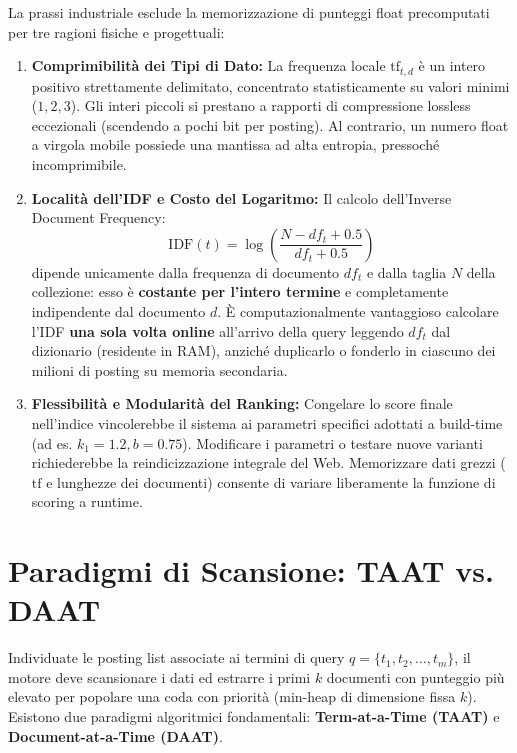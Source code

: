La prassi industriale esclude la memorizzazione di punteggi float precomputati per tre ragioni fisiche e progettuali:
\begin{enumerate}
    \item \textbf{Comprimibilit\`a dei Tipi di Dato:} La frequenza locale $\text{tf}_{t,d}$ \`e un intero positivo strettamente delimitato, concentrato statisticamente su valori minimi ($1, 2, 3$). Gli interi piccoli si prestano a rapporti di compressione lossless eccezionali (scendendo a pochi bit per posting). Al contrario, un numero float a virgola mobile possiede una mantissa ad alta entropia, pressoch\'e incomprimibile.
    \item \textbf{Localit\`a dell'IDF e Costo del Logaritmo:} Il calcolo dell'Inverse Document Frequency:
    \begin{equation}
    \text{IDF}(t) = \log \left( \frac{N - df_t + 0.5}{df_t + 0.5} \right)
    \end{equation}
    dipende unicamente dalla frequenza di documento $df_t$ e dalla taglia $N$ della collezione: esso \`e \textbf{costante per l'intero termine} e completamente indipendente dal documento $d$. \`E computazionalmente vantaggioso calcolare l'IDF \textbf{una sola volta online} all'arrivo della query leggendo $df_t$ dal dizionario (residente in RAM), anzich\'e duplicarlo o fonderlo in ciascuno dei milioni di posting su memoria secondaria.
    \item \textbf{Flessibilit\`a e Modularit\`a del Ranking:} Congelare lo score finale nell'indice vincolerebbe il sistema ai parametri specifici adottati a build-time (ad es. $k_1 = 1.2, b = 0.75$). Modificare i parametri o testare nuove varianti richiederebbe la reindicizzazione integrale del Web. Memorizzare dati grezzi ($\text{tf}$ e lunghezze dei documenti) consente di variare liberamente la funzione di scoring a runtime.
\end{enumerate}

\FloatBarrier
\section{Paradigmi di Scansione: TAAT vs. DAAT}
\label{sec:taat-vs-daat}

Individuate le posting list associate ai termini di query $q = \{t_1, t_2, \dots, t_m\}$, il motore deve scansionare i dati ed estrarre i primi $k$ documenti con punteggio pi\`u elevato per popolare una coda con priorit\`a (min-heap di dimensione fissa $k$). Esistono due paradigmi algoritmici fondamentali: \textbf{Term-at-a-Time (TAAT)} e \textbf{Document-at-a-Time (DAAT)}.


